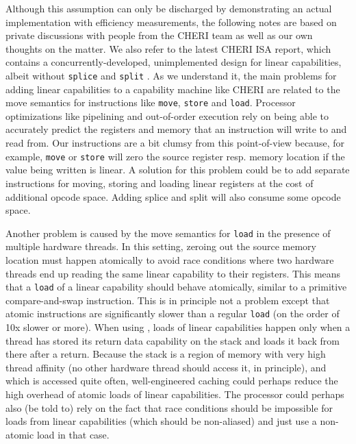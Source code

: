 Although this assumption can only be discharged by demonstrating an actual implementation with efficiency measurements, the following notes are based on private discussions with people from the CHERI team as well as our own thoughts on the matter.
We also refer to the latest CHERI ISA report, which contains a concurrently-developed, unimplemented design for linear capabilities, albeit without \texttt{splice} and \texttt{split} \citep[][\S D.7]{watson_capability_2020}.
As we understand it, the main problems for adding linear capabilities to a capability machine like CHERI are related to the move semantics for instructions like \texttt{move}, \texttt{store} and \texttt{load}.
Processor optimizations like pipelining and out-of-order execution rely on being able to accurately predict the registers and memory that an instruction will write to and read from.
Our instructions are a bit clumsy from this point-of-view because, for example, \texttt{move} or \texttt{store} will zero the source register resp. memory location if the value being written is linear.
A solution for this problem could be to add separate instructions for moving, storing and loading linear registers at the cost of additional opcode space.
Adding splice and split will also consume some opcode space.

Another problem is caused by the move semantics for \texttt{load} in the presence of multiple hardware threads.
In this setting, zeroing out the source memory location must happen atomically to avoid race conditions where two hardware threads end up reading the same linear capability to their registers.
This means that a \texttt{load} of a linear capability should behave atomically, similar to a primitive compare-and-swap instruction.
This is in principle not a problem except that atomic instructions are significantly slower than a regular \texttt{load} (on the order of 10x slower or more).
When using \stktokens{}, loads of linear capabilities happen only when a thread has stored its return data capability on the stack and loads it back from there after a return.
Because the stack is a region of memory with very high thread affinity (no other hardware thread should access it, in principle), and which is accessed quite often, well-engineered caching could perhaps reduce the high overhead of atomic loads of linear capabilities.
The processor could perhaps also (be told to) rely on the fact that race conditions should be impossible for loads from linear capabilities (which should be non-aliased) and just use a non-atomic load in that case.

